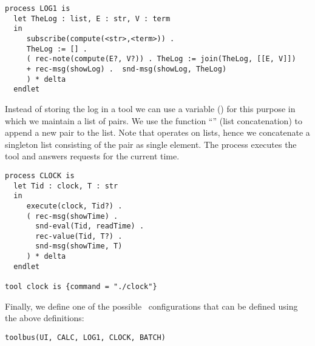 \small
\begin{verbatim}
process LOG1 is
  let TheLog : list, E : str, V : term
  in
     subscribe(compute(<str>,<term>)) .
     TheLog := [] .
     ( rec-note(compute(E?, V?)) . TheLog := join(TheLog, [[E, V]])
     + rec-msg(showLog) .  snd-msg(showLog, TheLog)
     ) * delta
  endlet

\end{verbatim}
\noindent
\normalsize
 Instead of storing the log in a tool we can use a variable ()
 for this purpose in which we maintain a list of pairs. We use
 the function ``'' (list concatenation) to append a new pair
 to the list. Note that  operates on lists, hence we concatenate
 a singleton list consisting of the pair as single element.
 The process  executes the  tool and answers
 requests for the current time.

\small
\begin{verbatim}
process CLOCK is
  let Tid : clock, T : str
  in
     execute(clock, Tid?) .
     ( rec-msg(showTime) .
       snd-eval(Tid, readTime) .
       rec-value(Tid, T?) .
       snd-msg(showTime, T)
     ) * delta
  endlet

tool clock is {command = "./clock"}

\end{verbatim}
\noindent
\normalsize
 Finally, we define one of the possible \TB\ configurations that can be defined
 using the above definitions:

\small
\begin{verbatim}
toolbus(UI, CALC, LOG1, CLOCK, BATCH)
\end{verbatim}
\normalsize
